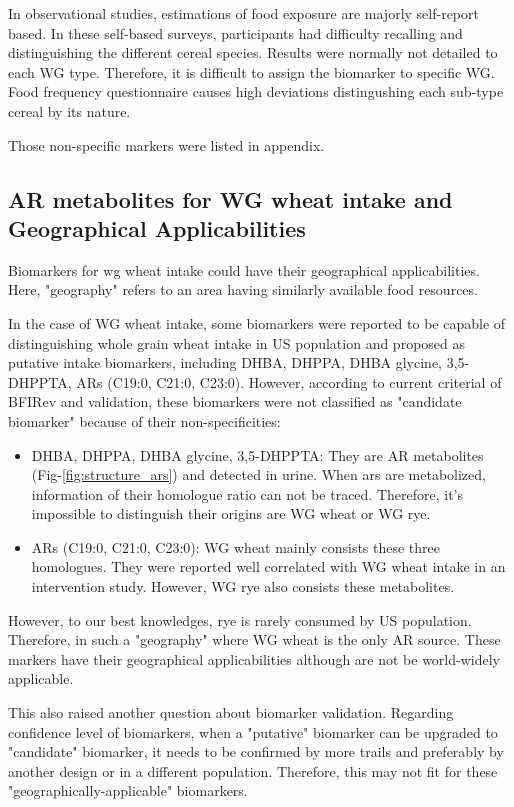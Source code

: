 In observational studies, estimations of food exposure are majorly self-report based. 
In these self-based surveys, participants had difficulty recalling and distinguishing the different cereal species. Results were normally not detailed to each WG type.
Therefore, it is difficult to assign the biomarker to specific WG. 
Food frequency questionnaire causes high deviations distingushing each sub-type cereal by its nature.

Those non-specific markers were listed in appendix. 

\subsection{AR metabolites for WG wheat intake and Geographical Applicabilities}
Biomarkers for \acrshort{wg} wheat intake could have their geographical applicabilities.
Here, "geography" refers to an area having similarly available food resources.

In the case of WG wheat intake, some biomarkers were reported to be capable of distinguishing whole grain wheat intake in US population and proposed as putative intake biomarkers, including DHBA, DHPPA, DHBA glycine, 3,5-DHPPTA\cite{ISI:000330080500002}, ARs (C19:0, C21:0, C23:0)\cite{ISI:000374112900032}. However, according to current criterial of BFIRev\cite{Pratico2018} and validation\cite{LarsValidation}, these biomarkers were not classified as "candidate biomarker" because of their non-specificities:
\begin{itemize}
	\item DHBA, DHPPA, DHBA glycine, 3,5-DHPPTA: They are AR metabolites (Fig-\ref{fig:structure_ars}) and detected in urine. When \acrshort{ars} are metabolized, information of their homologue ratio can not be traced. Therefore, it's impossible to distinguish their origins are WG wheat or WG rye.
	\item ARs (C19:0, C21:0, C23:0): WG wheat mainly consists these three homologues. They were reported well correlated with WG wheat intake in an intervention study\cite{ISI:000374112900032}. However, WG rye also consists these metabolites.
\end{itemize}

However, to our best knowledges, rye is rarely consumed by US population. Therefore, in such a "geography" where WG wheat is the only AR source. These markers have their geographical applicabilities although are not be world-widely applicable. 

This also raised another question about biomarker validation. Regarding confidence level of biomarkers, when a "putative" biomarker can be upgraded to "candidate" biomarker, it needs to be confirmed by more trails and preferably by another design or in a different population. Therefore, this may not fit for these "geographically-applicable" biomarkers. 

